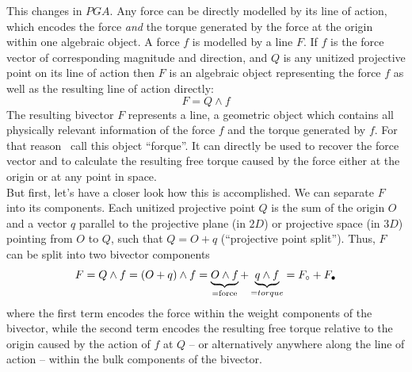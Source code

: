 This changes in $PGA$. Any force can be directly modelled by its line of action, which
encodes the force \emph{and} the torque generated by the force at the origin within one
algebraic object. A force $f$ is modelled by a line $F$. If $f$ is the force vector of
corresponding magnitude and direction, and $Q$ is any unitized projective point on its
line of action then $F$ is an algebraic object representing the force $f$ as well as the
resulting line of action directly:
\begin{equation}
F = Q \wedge f
\label{eq:line_of_action}
\end{equation}
The resulting bivector $F$ represents a line, a geometric object which contains all
physically relevant information of the force $f$ and the torque generated by $f$. For that
reason~\cite{Dynamics_in_PGA_plane-based_Dorst-DeKennik:2023} call this object ``forque''.
It can directly be used to recover the force vector and to calculate the resulting free
torque caused by the force either at the origin or at any point in space. \\

But first, let's have a closer look how this is accomplished. We can separate $F$ into its
components. Each unitized projective point $Q$ is the sum of the origin $O$ and a vector
$q$ parallel to the projective plane (in $2D$) or projective space (in $3D$) pointing from
$O$ to $Q$, such that $Q = O + q$ (``projective point split''). Thus, $F$ can be split into
two bivector components
\begin{equation}
    F = Q \wedge f = (O + q) \wedge f =
    \underbrace{O \wedge f}_{\text{=force}} + \underbrace{q \wedge f}_{=torque}
    = {F}_\circ + {F}_\bullet
\label{eq:line_of_action_components}
\end{equation}
where the first term encodes the force within the weight components of the bivector, while
the second term encodes the resulting free torque relative to the origin caused by the
action of $f$ at $Q$ -- or alternatively anywhere along the line of action -- within the
bulk components of the bivector. \\


